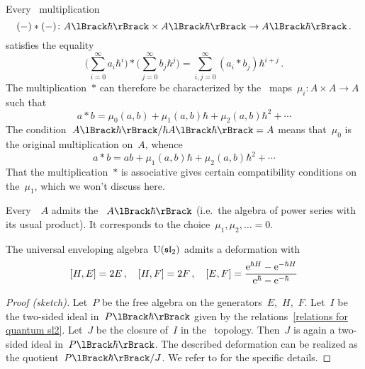 \documentclass[a4paper, 11pt, oneside]{scrartcl}
\begin{document}
\begin{remark}
  Every~\bilinear{$\kfhbar$} multiplication
  \[
    (-) * (-)
    \colon
    \power{A}{\hbar} \times \power{A}{\hbar}
    \to
    \power{A}{\hbar} \,.
  \]
  satisfies the equality
  \[
    \Biggl( \sum_{i=0}^\infty a_i \hbar^i \Biggr)
    *
    \Biggl( \sum_{j=0}^\infty b_j \hbar^j \Biggr)
    =
    \sum_{i,j = 0}^\infty (a_i * b_j) \hbar^{i+j} \,.
  \]
  The multiplication~$*$ can therefore be characterized by the~\bilinear{$\kf$} maps~$\mu_i \colon A \times A \to A$ such that
  \[
    a * b
    =
    \mu_0(a, b) + \mu_1(a, b) \hbar + \mu_2(a, b) \hbar^2 + \dotsb
  \]
  The condition~$\power{A}{\hbar} / \hbar \power{A}{\hbar} = A$ means that~$\mu_0$ is the original multiplication on~$A$, whence
  \[
    a * b
    =
    ab + \mu_1(a, b) \hbar + \mu_2(a, b) \hbar^2 + \dotsb
  \]
  That the multiplication~$*$ is associative gives certain compatibility conditions on the~$\mu_1$, which we won’t discuss here.
\end{remark}

\begin{example}
  Every~\algebra{$\kf$}~$A$ admits the ~$\power{A}{\hbar}$ (i.e.\ the algebra of power series with its usual product).
  It corresponds to the choice~$\mu_1, \mu_2, \dotsc = 0$.
\end{example}

\begin{theorem}
  \label{existence of Uhsl2}
  The universal enveloping algebra~$\operatorname{U}(\mathfrak{sl}_2)$ admits a deformation with
  \begin{equation}
    \label{relations for quantum sl2}
    [H, E] = 2E \,,
    \quad
    [H, F] = 2F \,,
    \quad
    [E, F]
    =
    \frac{ \mathrm{e}^{\hbar H} - \mathrm{e}^{-\hbar H} }{ \mathrm{e}^{\hbar} - \mathrm{e}^{-\hbar} }
  \end{equation}
\end{theorem}

\begin{proof}[Proof (sketch)]
  Let~$P$ be the free algebra on the generators~$E$,~$H$,~$F$.
  Let~$I$ be the two-sided ideal in~$\power{P}{\hbar}$ given by the relations~\eqref{relations for quantum sl2}.
  Let~$J$ be the closure of~$I$ in the~\adic{$\hbar$} topology.
  Then~$J$ is again a two-sided ideal in~$\power{P}{\hbar}$.
  The described deformation can be realized as the quotient~$\power{P}{\hbar} / J$.
  We refer to \cite[Definition-Proposition~6.4.3~ff.]{guide_to_quantum_groups} for the specific details.
\end{proof}
\end{document}
